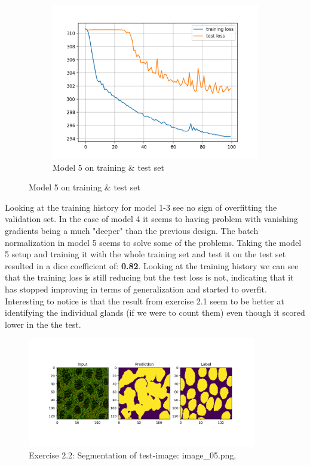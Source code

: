 \documentclass[a4paper,10pt]{article}
\begin{document}
\begin{figure}[htbp]
\begin{subfigure}{0.3\textwidth}
    \includegraphics[width=\textwidth]{figures/assignment_3/segmentation_model6.png}
    \caption{Model 5 on training \& test set}
    \label{fig:image2}
  \end{subfigure}
  \label{fig:both_images}
\end{figure}


Looking at the training history for model 1-3 see no sign of overfitting the validation set. In the case of model 4 it seems to having problem with vanishing gradients being a much "deeper" than the previous design. The batch normalization in model 5 seems to solve some of the problems.
Taking the model 5 setup and training it with the whole training set and test it on the test set resulted in a dice coefficient of: \textbf{0.82}. Looking at the training history we can see that the training loss is still reducing but the test loss is not, indicating that it has stopped improving in terms of generalization and started to overfit. Interesting to notice is that the result from exercise 2.1 seem to be better at identifying the individual glands (if we were to count them) even though it scored lower in the the test.

 \begin{figure}[ht!]
\centering
\includegraphics[width=100mm]{figures/assignment_3/segmentation_test_best.png}
\caption{Exercise 2.2: Segmentation of test-image: image\_05.png, }
\label{fig:segexample}
\end{figure}
\end{document}
